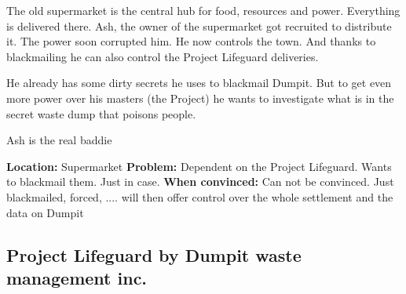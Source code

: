 \begin{npcBox}[title=Ash]
    \begin{stressSection}
    \end{stressSection}
    \begin{tabularx}{\textwidth}{ XX }
    \end{tabularx}

    \begin{consequences}
    \item {}
    \item {}
    \item {}
    \end{consequences}

    \begin{npcDescription}
    The old supermarket is the central hub for food, resources and power. Everything is delivered there. Ash, the owner of the supermarket got recruited to distribute it. The power soon corrupted him. He now controls the town. And thanks to blackmailing he can also control the Project Lifeguard deliveries.

    He already has some dirty secrets he uses to blackmail Dumpit. But to get even more power over his masters (the Project) he wants to investigate what is in the secret waste dump that poisons people.

    Ash is the real baddie

    \textbf{Location:} Supermarket
    \textbf{Problem:} Dependent on the Project Lifeguard. Wants to blackmail them. Just in case.
    \textbf{When convinced:} Can not be convinced. Just blackmailed, forced, .... will then offer control over the whole settlement and the data on Dumpit
    \end{npcDescription}

\end{npcBox}




\subsection{Project Lifeguard by Dumpit waste management inc.}


